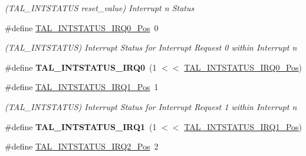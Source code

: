 \begin{DoxyCompactItemize}
\begin{DoxyCompactList}\small\item\em (T\+A\+L\+\_\+\+I\+N\+T\+S\+T\+A\+T\+U\+S reset\+\_\+value) Interrupt n Status \end{DoxyCompactList}\item 
\hypertarget{group___s_a_m_l21___t_a_l_ga76af35ee443b9bbf245f9c8974d9cbdd}{}\#define \hyperlink{group___s_a_m_l21___t_a_l_ga76af35ee443b9bbf245f9c8974d9cbdd}{T\+A\+L\+\_\+\+I\+N\+T\+S\+T\+A\+T\+U\+S\+\_\+\+I\+R\+Q0\+\_\+\+Pos}~0\label{group___s_a_m_l21___t_a_l_ga76af35ee443b9bbf245f9c8974d9cbdd}

\begin{DoxyCompactList}\small\item\em (T\+A\+L\+\_\+\+I\+N\+T\+S\+T\+A\+T\+U\+S) Interrupt Status for Interrupt Request 0 within Interrupt n \end{DoxyCompactList}\item 
\hypertarget{group___s_a_m_l21___t_a_l_ga69e34a7f2c84920d9ac804f97e75f830}{}\#define {\bfseries T\+A\+L\+\_\+\+I\+N\+T\+S\+T\+A\+T\+U\+S\+\_\+\+I\+R\+Q0}~(1 $<$$<$ \hyperlink{group___s_a_m_l21___t_a_l_ga76af35ee443b9bbf245f9c8974d9cbdd}{T\+A\+L\+\_\+\+I\+N\+T\+S\+T\+A\+T\+U\+S\+\_\+\+I\+R\+Q0\+\_\+\+Pos})\label{group___s_a_m_l21___t_a_l_ga69e34a7f2c84920d9ac804f97e75f830}

\item 
\hypertarget{group___s_a_m_l21___t_a_l_ga5748dfb05a54ad180910dc6f97cf7bbc}{}\#define \hyperlink{group___s_a_m_l21___t_a_l_ga5748dfb05a54ad180910dc6f97cf7bbc}{T\+A\+L\+\_\+\+I\+N\+T\+S\+T\+A\+T\+U\+S\+\_\+\+I\+R\+Q1\+\_\+\+Pos}~1\label{group___s_a_m_l21___t_a_l_ga5748dfb05a54ad180910dc6f97cf7bbc}

\begin{DoxyCompactList}\small\item\em (T\+A\+L\+\_\+\+I\+N\+T\+S\+T\+A\+T\+U\+S) Interrupt Status for Interrupt Request 1 within Interrupt n \end{DoxyCompactList}\item 
\hypertarget{group___s_a_m_l21___t_a_l_gac05a38e3564bf6445f2bf679d0f932c0}{}\#define {\bfseries T\+A\+L\+\_\+\+I\+N\+T\+S\+T\+A\+T\+U\+S\+\_\+\+I\+R\+Q1}~(1 $<$$<$ \hyperlink{group___s_a_m_l21___t_a_l_ga5748dfb05a54ad180910dc6f97cf7bbc}{T\+A\+L\+\_\+\+I\+N\+T\+S\+T\+A\+T\+U\+S\+\_\+\+I\+R\+Q1\+\_\+\+Pos})\label{group___s_a_m_l21___t_a_l_gac05a38e3564bf6445f2bf679d0f932c0}

\item 
\hypertarget{group___s_a_m_l21___t_a_l_gace5952f437d1963b04816383ff3d0c8e}{}\#define \hyperlink{group___s_a_m_l21___t_a_l_gace5952f437d1963b04816383ff3d0c8e}{T\+A\+L\+\_\+\+I\+N\+T\+S\+T\+A\+T\+U\+S\+\_\+\+I\+R\+Q2\+\_\+\+Pos}~2\label{group___s_a_m_l21___t_a_l_gace5952f437d1963b04816383ff3d0c8e}


\end{DoxyCompactItemize}
